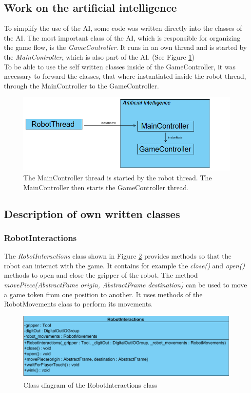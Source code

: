 \documentclass[a4paper]{spie}  %
\begin{document}
\begin{large}
\subsection{Work on the artificial intelligence}
To simplify the use of the AI, some code was written directly into the classes of the AI. The most important class of the AI, which is responsible for organizing the game flow, is the \emph{GameController}. It runs in an own thread and is started by the \emph{MainController}, which is also part of the AI. (See Figure \ref{thread_diagram})\\
To be able to use the self written classes inside of the GameController, it was necessary to forward the classes, that where instantiated inside the robot thread, through the MainController to the GameController.
\begin{figure}[h]
\includegraphics[width=15cm]{images/diagram.png}
\centering
\caption{The MainController thread is started by the robot thread. The MainController then starts the GameController thread.}
\label{thread_diagram}
\end{figure}
\subsection{Description of own written classes}
\subsubsection{RobotInteractions}
The \emph{RobotInteractions} class shown in Figure \ref{class_roboInt} provides methods so that the robot can interact with the game. It contains for example the \emph{close()} and \emph{open()} methods to open and close the gripper of the robot. The method \emph{movePiece(AbstractFame origin, AbstractFrame destination)} can be used to move a game token from one position to another. It uses methods of the RobotMovements class to perform its movements.
\begin{figure}[h]
\includegraphics[width=15cm]{images/class_roboInt.png}
\centering
\caption{Class diagram of the RobotInteractions class}
\label{class_roboInt}
\end{figure}


\end{large}
\end{document}
